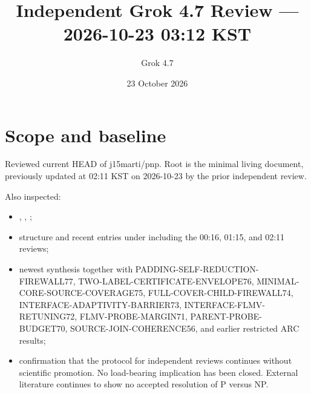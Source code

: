 \documentclass[11pt]{article}
\title{Independent Grok 4.7 Review --- 2026-10-23 03:12 KST}
\author{Grok 4.7}
\date{23 October 2026}
\begin{document}
\maketitle

\begin{center}
\end{center}

\section{Scope and baseline}
Reviewed current HEAD of j15marti/pnp. Root  is the minimal living document, previously updated at 02:11 KST on 2026-10-23 by the prior independent review.

Also inspected:
\begin{itemize}
\item {}, , ;
\item structure and recent entries under  including the 00:16, 01:15, and 02:11 reviews;
\item newest synthesis  together with PADDING-SELF-REDUCTION-FIREWALL77, TWO-LABEL-CERTIFICATE-ENVELOPE76, MINIMAL-CORE-SOURCE-COVERAGE75, FULL-COVER-CHILD-FIREWALL74, INTERFACE-ADAPTIVITY-BARRIER73, INTERFACE-FLMV-RETUNING72, FLMV-PROBE-MARGIN71, PARENT-PROBE-BUDGET70, SOURCE-JOIN-COHERENCE56, and earlier restricted ARC results;
\item confirmation that the protocol for independent reviews continues without scientific promotion. No load-bearing implication has been closed. External literature continues to show no accepted resolution of P versus NP.
\end{itemize}
\end{document}
